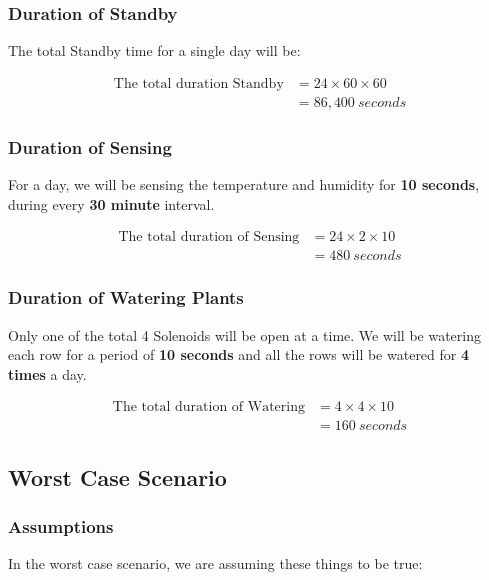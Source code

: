 \documentclass[../main.tex]{subfiles}
\begin{document}
\subsubsection{Duration of Standby}

The total Standby time for a single day will be:

\begin{align*}
    \mbox{The total duration Standby} &= 24 \times 60 \times 60 \\
    &= 86,400 \: seconds
\end{align*}

\subsubsection{Duration of Sensing}

For a day, we will be sensing the temperature and humidity for \textbf{10 seconds},
during every \textbf{30 minute} interval.

\begin{align*}
    \mbox{The total duration of Sensing} &= 24 \times 2 \times 10 \\
    &= 480 \: seconds
\end{align*}

\subsubsection{Duration of Watering Plants}

\indent Only one of the total 4 Solenoids will be open at a time. We will be watering
each row for a period of \textbf{10 seconds} and all the rows will be watered for
\textbf{4 times} a day.

\begin{align*}
    \mbox{The total duration of Watering} &= 4 \times 4 \times 10 \\
    &= 160 \: seconds
\end{align*}

\subsection{Worst Case Scenario}

\subsubsection{Assumptions}

In the worst case scenario, we are assuming these things to be true:
\end{document}
